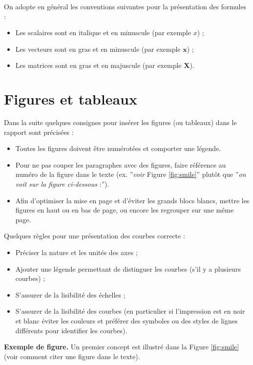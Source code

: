 On adopte en général les conventions suivantes pour la présentation des formules :
\begin{itemize}
	\item Les scalaires sont en italique et en minuscule (par exemple $x$) ;
	\item Les vecteurs sont en gras et en minuscule (par exemple $\textbf{x}$) ;
	\item Les matrices sont en gras et en majuscule (par exemple $\textbf{X}$).

\end{itemize}

\section*{Figures et tableaux}
Dans la suite quelques consignes pour insérer les figures (ou tableaux) dans le rapport sont précisées :
\begin{itemize}
	\item Toutes les figures doivent être numérotées et comporter une légende.
	\item Pour ne pas couper les paragraphes avec des figures, faire référence au numéro de la figure dans le texte (ex. ”\textit{voir} Figure \ref{fig:smile}” plutôt que ”\textit{on voit sur la figure ci-dessous} :”).
	\item Afin d’optimiser la mise en page et d’éviter les grands blocs blancs, mettre les figures en haut ou en bas de page, ou encore les regrouper sur une même page.
\end{itemize}

Quelques règles pour une présentation des courbes correcte :
\begin{itemize}
	\item Préciser la nature et les unités des axes ;
	\item Ajouter une légende permettant de distinguer les courbes (s’il y a plusieurs courbes) ;
	\item S’assurer de la lisibilité des échelles ;
	\item S’assurer de la lisibilité des courbes (en particulier si l’impression est en noir et blanc éviter les couleurs et préférer des symboles ou des styles de lignes différents pour identifier les courbes).
\end{itemize}


\textbf{Exemple de figure.} Un premier concept est illustré dans la Figure \ref{fig:smile} (voir comment citer une figure dans le texte).

